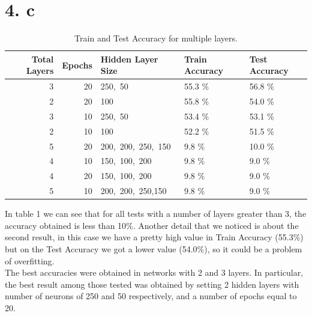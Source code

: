 \documentclass[
	12pt, %
]{fphw}
\begin{document}
\section* {4. c}

\begin{table}[ht]
\begin{center}
\caption{Train and Test Accuracy for multiple layers.}
\begin{tabular}{rrlll}
\toprule
 Total Layers &  Epochs & Hidden Layer Size & Train Accuracy & Test Accuracy \\
\midrule
            3 &      20 &            250,\ 50 &         55.3 \% &        56.8 \% \\
            2 &      20 &               100 &         55.8 \% &        54.0 \% \\
            3 &      10 &            250,\ 50 &         53.4 \% &        53.1 \% \\
            2 &      10 &               100 &         52.2 \% &        51.5 \% \\
            5 &      20 &   200,\ 200,\ 250,\ 150 &          9.8 \% &        10.0 \% \\
            4 &      10 &       150,\ 100,\ 200 &          9.8 \% &         9.0 \% \\
            4 &      20 &       150,\ 100,\ 200 &          9.8 \% &         9.0 \% \\
            5 &      10 &   200,\ 200,\ 250,150 &          9.8 \% &         9.0 \% \\
\bottomrule
\end{tabular}
\end{center}
\end{table}

In table 1 we can see that for all tests with a number of layers greater than 3, the accuracy obtained is less than 10\%.
Another detail that we noticed is about the second result, in this case we have a pretty high value in Train Accuracy (55.3\%) but on the Test Accuracy we got a lower value (54.0\%), so it could be a problem of overfitting. \\ The best accuracies were obtained in networks with 2 and 3 layers. In particular, the best result among those tested was obtained by setting 2 hidden layers with number of neurons of 250 and 50 respectively, and a number of epochs equal to 20. \\










\end{document}

